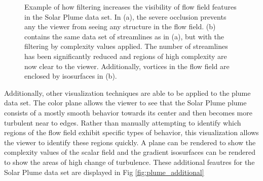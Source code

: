 \documentclass{egpubl}
\begin{document}
\begin{figure}[h]
\begin{minipage}{0.47\linewidth}
                \end{minipage}
        \caption{Example of how filtering increases the visibility of flow field features in the Solar Plume data set. In (a), the severe occlusion prevents any the viewer from seeing any structure in the flow field. (b) contains the same data set of streamlines as in (a), but with the filtering by complexity values applied. The number of streamlines has been significantly reduced and regions of high complexity are now clear to the viewer. Additionally, vortices in the flow field are enclosed by isosurfaces in (b).}
        \label{fig:plume_lines}
\end{figure}

Additionally, other visualization techniques are able to be applied to the plume data set.
The color plane allows the viewer to see that the Solar Plume plume consists of a mostly smooth behavior towards its center and then becomes more turbulent near to edges.
Rather than manually attempting to identify which regions of the flow field exhibit specific types of behavior, this visualization allows the viewer to identify these regions quickly.
A plane can be rendered to show the complexity values of the scalar field and the gradient isosurfaces can be rendered to show the areas of high change of turbulence.
These additional feautres for the Solar Plume data set are displayed in Fig \ref{fig:plume_additional}
\end{document}
